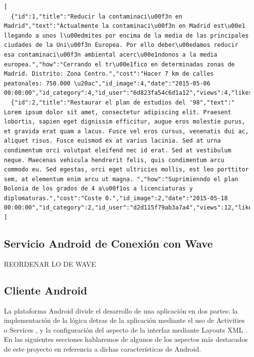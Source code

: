 \lstset{
  language        = c,    inputencoding=utf8}
\begin{lstlisting}[frame=single]
[
  {"id":1,"title":"Reducir la contaminaci\u00f3n en Madrid","text":"Actualmente la contaminaci\u00f3n en Madrid est\u00e1 llegando a unos l\u00edmites por encima de la media de las principales ciudades de la Uni\u00f3n Europea. Por ello deber\u00edamos reducir esa contaminaci\u00f3n ambiental acerc\u00e1ndonos a la media europea.","how":"Cerrando el tr\u00e1fico en determinadas zonas de Madrid. Distrito: Zona Centro.","cost":"Hacer 7 km de calles peatonales: 750.000 \u20ac","id_image":4,"date":"2015-05-06 00:00:00","id_category":4,"id_user":"6d823fa54c6d1a12","views":4,"likes":3,"not_understood":0,"dislikes":0},
  {"id":2,"title":"Restaurar el plan de estudios del '98","text":" Lorem ipsum dolor sit amet, consectetur adipiscing elit. Praesent lobortis, sapien eget dignissim efficitur, augue eros molestie purus, et gravida erat quam a lacus. Fusce vel eros cursus, venenatis dui ac, aliquet risus. Fusce euismod ex at varius lacinia. Sed at urna condimentum orci volutpat eleifend nec id erat. Sed at vestibulum neque. Maecenas vehicula hendrerit felis, quis condimentum arcu commodo eu. Sed egestas, orci eget ultricies mollis, est leo porttitor sem, at elementum enim arcu ut magna. ","how":"Suprimienndo el plan Bolonia de los grados de 4 a\u00f1os a licenciaturas y diplomaturas.","cost":"Coste 0.","id_image":2,"date":"2015-05-18 00:00:00","id_category":2,"id_user":"d2d115f79ab3a7a4","views":12,"likes":0,"not_understood":1,"dislikes":0}
]
\end{lstlisting}

\subsection{Servicio Android de Conexión con Wave}

	REORDENAR LO DE WAVE

\subsection{Cliente Android}

	La plataforma Android divide el desarrollo de una aplicación en dos partes: la implementación de la lógica detras de la aplicación mediante el uso de Activities \cite{ref:android_activities} o Services \cite{ref:android_service}, y la configuración del aspecto de la interfaz mediante Layouts XML \cite{ref:android_layout}. En las siguientes secciones hablaremos de algunos de los aspectos más destacados de este proyecto en referencia a dichas características de Android.

